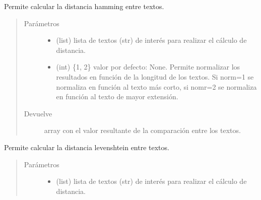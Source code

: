 \documentclass[letterpaper,10pt,openany,spanish]{sphinxmanual}
\begin{document}
\begin{fulllineitems}
\begin{fulllineitems}
\label{\detokenize{funciones/comparacion:comparacion.DiferenciaStrings.distancia_hamming}}
Permite calcular la distancia hamming entre textos.
\begin{quote}\begin{description}
\item[{Parámetros}] \leavevmode\begin{itemize}
\item {} 
 \textendash{} (list) lista de textos (str) de interés para realizar 
el cálculo de distancia.

\item {} 
 \textendash{} (int) \{1, 2\} valor por defecto: None. Permite normalizar 
los resultados en función de la longitud de los textos. 
Si norm=1 se normaliza en función al texto más corto, 
si nomr=2 se normaliza en función al texto de mayor extensión.

\end{itemize}

\item[{Devuelve}] \leavevmode
array con el valor resultante de la comparación entre los 
textos.

\end{description}\end{quote}

\end{fulllineitems}


\begin{fulllineitems}
\label{\detokenize{funciones/comparacion:comparacion.DiferenciaStrings.distancia_levenshtein}}
Permite calcular la distancia levenshtein entre textos.
\begin{quote}\begin{description}
\item[{Parámetros}] \leavevmode\begin{itemize}
\item {} 
 \textendash{} (list) lista de textos (str) de interés para realizar 
el cálculo de distancia.


\end{itemize}
\end{description}
\end{quote}
\end{fulllineitems}
\end{fulllineitems}
\end{document}
